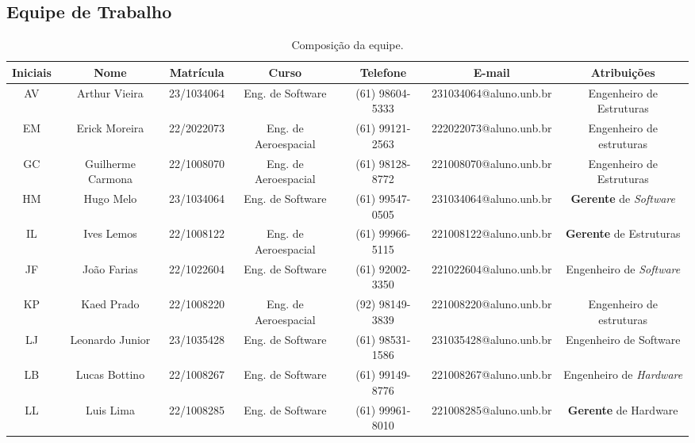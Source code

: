 \begin{landscape}

\chapter{Equipe de Trabalho}

\begin{table}[htpb]
\begin{center}
\caption{Composição da equipe.}
\begin{tabular}{|c|c|c|c|c|c|c|}
\hline
\textbf{Iniciais} & \textbf{Nome} & \textbf{Matrícula} & \textbf{Curso} & \textbf{Telefone} & \textbf{E-mail} & \textbf{Atribuições}\\ \hline
AV & Arthur Vieira        & 23/1034064        & Eng. de Software      & (61) 98604-5333   & 231034064@aluno.unb.br   & Engenheiro de Estruturas \\ \hline
EM & Erick Moreira         & 22/2022073        & Eng. de Aeroespacial  & (61) 99121-2563   & 222022073@aluno.unb.br   & Engenheiro de estruturas \\ \hline
GC & Guilherme Carmona     & 22/1008070        & Eng. de Aeroespacial  & (61) 98128-8772   & 221008070@aluno.unb.br   & Engenheiro de Estruturas \\ \hline
HM & Hugo Melo             & 23/1034064        & Eng. de Software      & (61) 99547-0505   & 231034064@aluno.unb.br   & \textbf{Gerente} de \textit{Software} \\ \hline
IL & Ives Lemos            & 22/1008122        & Eng. de Aeroespacial  & (61) 99966-5115   & 221008122@aluno.unb.br   & \textbf{Gerente} de Estruturas \\ \hline
JF & João Farias           & 22/1022604        & Eng. de Software      & (61) 92002-3350   & 221022604@aluno.unb.br   & Engenheiro de \textit{Software} \\ \hline
KP & Kaed Prado            & 22/1008220        & Eng. de Aeroespacial  & (92) 98149-3839   & 221008220@aluno.unb.br   & Engenheiro de estruturas \\ \hline
LJ & Leonardo Junior       & 23/1035428        & Eng. de Software      & (61) 98531-1586   & 231035428@aluno.unb.br   & Engenheiro de Software \\ \hline
LB & Lucas Bottino         & 22/1008267        & Eng. de Software      & (61) 99149-8776   & 221008267@aluno.unb.br   & Engenheiro de \textit{Hardware} \\ \hline
LL & Luis Lima             & 22/1008285        & Eng. de Software      & (61) 99961-8010   & 221008285@aluno.unb.br   & \textbf{Gerente} de Hardware \\ \hline

\end{tabular}
\end{center}
\end{table}
\end{landscape}
